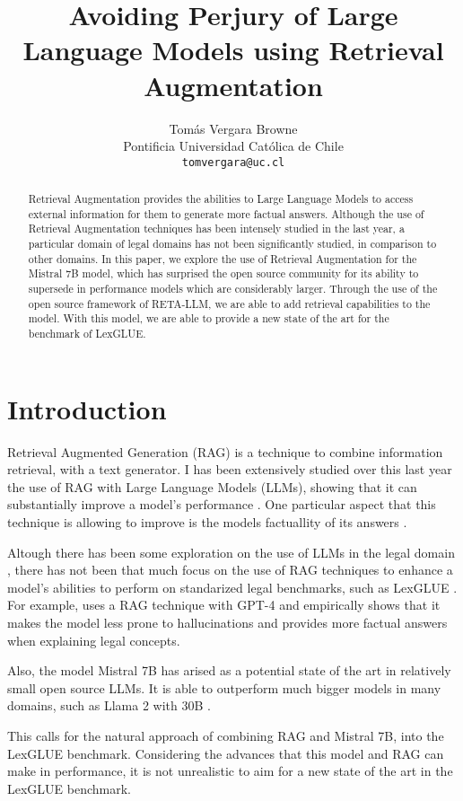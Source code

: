 \documentclass[11pt]{article}
\title{Avoiding Perjury of Large Language Models using Retrieval Augmentation}
\author{Tomás Vergara Browne \\
  Pontificia Universidad Católica de Chile \\
  \texttt{tomvergara@uc.cl} \\}
\begin{document}
\maketitle
\begin{abstract}
  Retrieval Augmentation provides the abilities to Large Language Models to access external information for them to generate more factual answers. Although the use of Retrieval Augmentation techniques has been intensely studied in the last year, a particular domain of legal domains has not been significantly studied, in comparison to other domains. In this paper, we explore the use of Retrieval Augmentation for the Mistral 7B model, which has surprised the open source community for its ability to supersede in performance models which are considerably larger. Through the use of the open source framework of RETA-LLM, we are able to add retrieval capabilities to the model. With this model, we are able to provide a new state of the art for the benchmark of LexGLUE.
\end{abstract}

\section{Introduction}
Retrieval Augmented Generation (RAG) is a technique to combine information retrieval, with a text generator. I has been extensively studied over this last year the use of RAG with Large Language Models (LLMs), showing that it can substantially improve a model's performance \cite{ram2023context}. One particular aspect that this technique is allowing to improve is the models factuallity of its answers \cite{lewis2020retrieval}.

Altough there has been some exploration on the use of LLMs in the legal domain \cite{chalkidis2020legal}, there has not been that much focus on the use of RAG techniques to enhance a model's abilities to perform on standarized legal benchmarks, such as LexGLUE \cite{chalkidis-etal-2022-lexglue}. For example, \cite{savelka2023explaining} uses a RAG technique with GPT-4 and empirically shows that it makes the model less prone to hallucinations and provides more factual answers when explaining legal concepts.

Also, the model Mistral 7B \cite{jiang2023mistral} has arised as a potential state of the art in relatively small open source LLMs. It is able to outperform much bigger models in many domains, such as Llama 2 with 30B \cite{touvron2023llama}.

This calls for the natural approach of combining RAG and Mistral 7B, into the LexGLUE benchmark. Considering the advances that this model and RAG can make in performance, it is not unrealistic to aim for a new state of the art in the LexGLUE benchmark.
\end{document}
